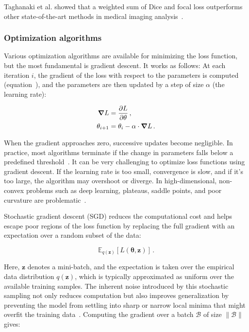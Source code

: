 Taghanaki et al. showed that a weighted sum of Dice and focal loss outperforms other state-of-the-art methods in medical imaging analysis~\cite{taghanaki_combo_2019}.  



\subsubsection{Optimization algorithms}
\label{sec:03_optimization_algorithms}

Various optimization algorithms are available for minimizing the loss function, but the most fundamental is gradient descent. It works as follows: 
At each iteration $i$, the gradient of the loss with respect to the parameters is computed (equation~), and the parameters are then updated by a step of size $\alpha$ (the learning rate):

\begin{align}
\label{eq:gradient_descent1}
	\grad L & = \frac{\partial L}{\partial \theta} \,,\\
\label{eq:gradient_descent2}
	\theta_{i+1} & = \theta_i - \alpha \cdot \grad L \,.
\end{align}

When the gradient approaches zero, successive updates become negligible. In practice, most algorithms terminate if the change in parameters falls below a predefined threshold~\cite{prince_understanding_2023}.
It can be very challenging to optimize loss functions using gradient descent. If the learning rate is too small, convergence is slow, and if it's too large, the algorithm may overshoot or diverge. In high-dimensional, non-convex problems such as deep learning, plateaus, saddle points, and poor curvature are problematic~\cite{murphy_probabilistic_2022}. 

Stochastic gradient descent (SGD) reduces the computational cost and helps escape poor regions of the loss function by replacing the full gradient with an expectation over a random subset of the data:

\begin{equation}
\label{eq:stochastic_optimization}
	\mathbb{E}_{q(\mathbf{z})} \left[ L \left( \boldsymbol{\theta}, \mathbf{z} \right) \right] \,.
\end{equation}

Here, $\mathbf{z}$ denotes a mini-batch, and the expectation is taken over the empirical data distribution $q(\mathbf{z})$, which is typically approximated as uniform over the available training samples. The inherent noise introduced by this stochastic sampling not only reduces computation but also improves generalization by preventing the model from settling into sharp or narrow local minima that might overfit the training data~\cite{prince_understanding_2023}. 
Computing the gradient over a batch $\mathcal{B}$ of size $\|\mathcal{B}\|$ gives: 

